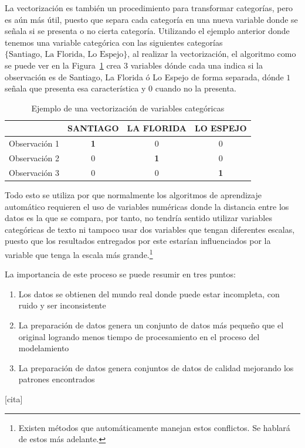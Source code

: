 \begin{description}
  La vectorización es también un procedimiento para transformar categorías, pero es aún más útil, puesto que separa cada categoría en una nueva variable donde se señala si se presenta o no cierta categoría. Utilizando el ejemplo anterior donde tenemos una variable categórica con las siguientes categorías $\{\textrm{Santiago, La Florida, Lo Espejo}\}$, al realizar la vectorización, el algoritmo como se puede ver en la Figura~\ref{fig:vect} crea 3 variables dónde cada una indica si la observación es de Santiago, La Florida ó Lo Espejo de forma separada, dónde $1$ señala que presenta esa característica y $0$ cuando no la presenta.
    \begin{table}[H]
    \centering
    \begin{tabular}{l|c|c|c|}
    \cline{2-4}
     & \multicolumn{1}{l|}{\textbf{SANTIAGO}} & \multicolumn{1}{l|}{\textbf{LA FLORIDA}} & \multicolumn{1}{l|}{\textbf{LO ESPEJO}} \\ \hline
    \multicolumn{1}{|l|}{Observación 1} & \textbf{1} & 0 & 0 \\ \hline
    \multicolumn{1}{|l|}{Observación 2} & 0 & \textbf{1} & 0 \\ \hline
    \multicolumn{1}{|l|}{Observación 3} & 0 & 0 & \textbf{1} \\ \hline
    \end{tabular}
    \caption{Ejemplo de una vectorización de variables categóricas}
    \label{fig:vect}
    \end{table}
      
  Todo esto se utiliza por que normalmente los algoritmos de aprendizaje automático requieren el uso de variables numéricas donde la distancia entre los datos es la que se compara, por tanto, no tendría sentido utilizar variables categóricas de texto ni tampoco usar dos variables que tengan diferentes escalas, puesto que los resultados entregados por este estarían influenciados por la variable que tenga la escala más grande.\footnote{Existen métodos que automáticamente manejan estos conflictos. Se hablará de estos más adelante.}

\end{description}
La importancia de este proceso se puede resumir en tres puntos:
\begin{enumerate}
  \item Los datos se obtienen del mundo real donde puede estar incompleta, con ruido y ser inconsistente
  \item La preparación de datos genera un conjunto de datos más pequeño que el original logrando menos tiempo de procesamiento en el proceso del modelamiento
  \item La preparación de datos genera conjuntos de datos de calidad mejorando los patrones encontrados
\end{enumerate}
[cita]

